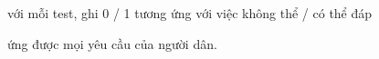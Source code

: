 với mỗi test, ghi 0 / 1 tương ứng với việc không thể / có thể đáp

ứng được mọi yêu cầu của người dân.